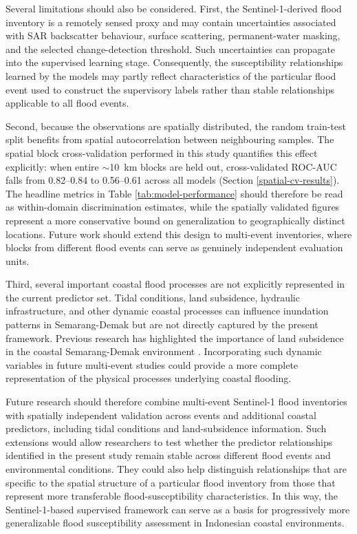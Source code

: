 \documentclass[11pt,twoside]{article}
\begin{document}
Several limitations should also be considered. First, the Sentinel-1-derived flood inventory is a remotely sensed proxy and may contain uncertainties associated with SAR backscatter behaviour, surface scattering, permanent-water masking, and the selected change-detection threshold. Such uncertainties can propagate into the supervised learning stage. Consequently, the susceptibility relationships learned by the models may partly reflect characteristics of the particular flood event used to construct the supervisory labels rather than stable relationships applicable to all flood events.

Second, because the observations are spatially distributed, the random train-test split benefits from spatial autocorrelation between neighbouring samples. The spatial block cross-validation performed in this study quantifies this effect explicitly: when entire $\sim$10~km blocks are held out, cross-validated ROC-AUC falls from 0.82--0.84 to 0.56--0.61 across all models (Section \ref{spatial-cv-results}). The headline metrics in Table \ref{tab:model-performance} should therefore be read as within-domain discrimination estimates, while the spatially validated figures represent a more conservative bound on generalization to geographically distinct locations. Future work should extend this design to multi-event inventories, where blocks from different flood events can serve as genuinely independent evaluation units.

Third, several important coastal flood processes are not explicitly represented in the current predictor set. Tidal conditions, land subsidence, hydraulic infrastructure, and other dynamic coastal processes can influence inundation patterns in Semarang-Demak but are not directly captured by the present framework. Previous research has highlighted the importance of land subsidence in the coastal Semarang-Demak environment \parencite{abidin2015}. Incorporating such dynamic variables in future multi-event studies could provide a more complete representation of the physical processes underlying coastal flooding.

Future research should therefore combine multi-event Sentinel-1 flood inventories with spatially independent validation across events and additional coastal predictors, including tidal conditions and land-subsidence information. Such extensions would allow researchers to test whether the predictor relationships identified in the present study remain stable across different flood events and environmental conditions. They could also help distinguish relationships that are specific to the spatial structure of a particular flood inventory from those that represent more transferable flood-susceptibility characteristics. In this way, the Sentinel-1-based supervised framework can serve as a basis for progressively more generalizable flood susceptibility assessment in Indonesian coastal environments.
\end{document}
